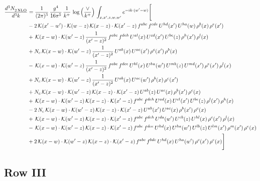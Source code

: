 \documentclass[9pt]{article}
\numberwithin{equation}{section}
\begin{document}
\begin{align}
    \frac{d^{3}N_{2\,\rm NLO}^{\rm}}{d^{3}k}  & = \frac{1}{(2\pi)^{3}}\,\frac{g^{4}}{16\pi^{5}}\,\frac{1}{k^{+}}\,\log{\left(\frac{\vee}{k^{+}}\right)}\, \int_{x,x',z,w,w'}e^{-ik\cdot(w'-w)}\Bigg[\notag\\ & -2\,\mathcal{K}(x'-w')\cdot\mathcal{K}(w-z)\,\mathcal{K}(x-z)\cdot\mathcal{K}(x'-z)\,f^{abc}\,f^{cde}\,U^{hd}(x')\,U^{ha}(w)\,\rho^{b}(x)\,\rho^{e}(x')\notag \\ 
&+\,\mathcal{K}(x-w)\cdot\mathcal{K}(w'-z)\,\frac{1}{(x'-z)^{2}}\,f^{abc}\,f^{deh}\,U^{al}(x)\,U^{cd}(x')\,U^{be}(z)\,\rho^{h}(x')\,\rho^{l}(x)\notag \\ 
&+N_{c}\,\mathcal{K}(x-w)\cdot\mathcal{K}(w'-z)\,\frac{1}{(x'-z)^{2}}\,U^{ab}(x)\,U^{ac}(x')\,\rho^{c}(x')\,\rho^{b}(x)\notag \\ 
&-\,\mathcal{K}(x-w)\cdot\mathcal{K}(w'-z)\,\frac{1}{(x'-z)^{2}}\,f^{abc}\,f^{dce}\,U^{hl}(x)\,U^{ha}(w')\,U^{mb}(z)\,U^{md}(x')\,\rho^{e}(x')\,\rho^{l}(x)\notag \\ & +N_{c}\,\mathcal{K}(x-w)\cdot\mathcal{K}(w'-z)\,\frac{1}{(x'-z)^{2}}\,U^{ab}(x)\,U^{ac}(w')\,\rho^{b}(x)\,\rho^{c}(x')\notag \\ 
&+N_{c}\,\mathcal{K}(x-w)\cdot\mathcal{K}(w'-z)\,\mathcal{K}(x-z)\cdot\mathcal{K}(x'-z)\,U^{ab}(z)\,U^{ac}(x)\,\rho^{b}(x')\,\rho^{c}(x)\notag \\ 
&+\,\mathcal{K}(x-w)\cdot\mathcal{K}(w'-z)\,\mathcal{K}(x-z)\cdot\mathcal{K}(x'-z)\,f^{abc}\,f^{deh}\,U^{ad}(x)\,U^{cl}(x')\,U^{be}(z)\,\rho^{l}(x')\,\rho^{h}(x)\notag \\ 
&-2\,N_{c}\,\mathcal{K}(x-w)\cdot\mathcal{K}(w'-z)\,\mathcal{K}(x-z)\cdot\mathcal{K}(x'-z)\,U^{ab}(x')\,U^{ac}(x)\,\rho^{b}(x')\,\rho^{c}(x)\notag \\ 
&+\,\mathcal{K}(x-w)\cdot\mathcal{K}(w'-z)\,\mathcal{K}(x-z)\cdot\mathcal{K}(x'-z)\,f^{abc}\,f^{deh}\,U^{da}(w')\,U^{eb}(z)\,U^{hl}(x)\,\rho^{c}(x')\,\rho^{l}(x)\notag \\ 
&-\,\mathcal{K}(x-w)\cdot\mathcal{K}(w'-z)\,\mathcal{K}(x-z)\cdot\mathcal{K}(x'-z)\,f^{abc}\,f^{dce}\,U^{hd}(x)\,U^{ha}(w')\,U^{lb}(z)\,U^{lm}(x')\,\rho^{m}(x')\,\rho^{e}(x)\notag \\ 
&+2\,\mathcal{K}(x-w)\cdot\mathcal{K}(w'-z)\,\mathcal{K}(x-z)\cdot\mathcal{K}(x'-z)\,f^{abc}\,f^{bde}\,U^{hd}(x)\,U^{ha}(w')\,\rho^{c}(x')\,\rho^{e}(x)\Bigg]
\end{align}
\subsection{Row III}
\end{document}
